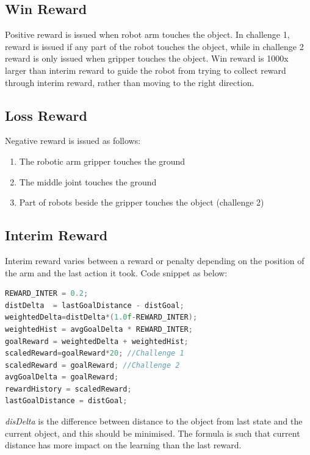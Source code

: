 \documentclass[10pt,journal,compsoc]{IEEEtran}
\begin{document}
\subsection{Win Reward}
Positive reward is issued when robot arm touches the object.  In challenge 1, reward is issued if any part of the robot touches the object, while in challenge 2 reward is only issued when gripper touches the object.  Win reward is 1000x larger than interim reward to guide the robot from trying to collect reward through interim reward, rather than moving to the right direction.

\subsection{Loss Reward}
Negative reward is issued as follows:
\begin{enumerate}
    \item The robotic arm gripper touches the ground
    \item The middle joint touches the ground
    \item Part of robots beside the gripper touches the object (challenge 2)
\end{enumerate}

\subsection{Interim Reward}
Interim reward varies between a reward or penalty depending on the position of the arm and the last action it took. Code snippet as below:
\begin{lstlisting}[language=C++]
REWARD_INTER = 0.2;
distDelta  = lastGoalDistance - distGoal;
weightedDelta=distDelta*(1.0f-REWARD_INTER);
weightedHist = avgGoalDelta * REWARD_INTER;
goalReward = weightedDelta + weightedHist;
scaledReward=goalReward*20; //Challenge 1
scaledReward = goalReward; //Challenge 2
avgGoalDelta = goalReward;
rewardHistory = scaledReward;
lastGoalDistance = distGoal;
\end{lstlisting}
\textit{disDelta} is the difference between distance to the object from last state and the current object, and this should be minimised.  The formula is such that current distance has more impact on the learning than the last reward.

\end{document}
